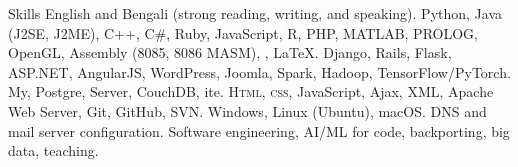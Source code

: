 \begin{rubric}{Skills}
\entry*[Languages]
\vspace{-2mm}
	English and Bengali (strong reading, writing, and speaking).
\vspace{-2mm}
\entry*[Coding]
\vspace{-2mm}
	Python, Java (J2SE, J2ME), C++, C\#, Ruby, JavaScript, R, PHP, MATLAB, PROLOG, OpenGL, Assembly (8085, 8086 MASM), , \LaTeX.
\vspace{-2mm}
\entry*[Frameworks]
\vspace{-2mm}
	Django, Rails, Flask, ASP.NET, AngularJS, WordPress, Joomla, Spark, Hadoop, TensorFlow/PyTorch.
\vspace{-2mm}
\entry*[Databases]
\vspace{-2mm}
	My, Postgre,  Server, CouchDB, ite.
\vspace{-2mm}
\entry*[Web]
\vspace{-2mm}
	\textsc{Html}, \textsc{css}, JavaScript, Ajax, XML, Apache Web Server, Git, GitHub, SVN.
\vspace{-2mm}
\entry*[Systems]
\vspace{-2mm}
	Windows, Linux (Ubuntu), macOS. DNS and mail server configuration.
\vspace{-2mm}
\entry*[Focus]
\vspace{-2mm}
	Software engineering, AI/ML for code, backporting, big data, teaching.
\vspace{-2mm}
\end{rubric}
